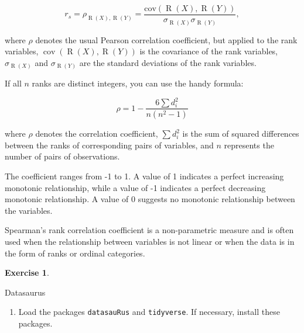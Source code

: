 \documentclass[
  12pt,
  oneside]{book}
\providecommand{\tightlist}{%
  \setlength{\itemsep}{0pt}\setlength{\parskip}{0pt}}
\theoremstyle{definition}
\theoremstyle{definition}
\theoremstyle{definition}
\newtheorem{exercise}{Exercise}[chapter]
\theoremstyle{definition}
\theoremstyle{remark}
\begin{document}
\[
r_s = \rho_{\operatorname{R}(X),\operatorname{R}(Y)} = \frac{\text{cov}(\operatorname{R}(X), \operatorname{R}(Y))}{\sigma_{\operatorname{R}(X)} \sigma_{\operatorname{R}(Y)}},
\]

where
\(\rho\) denotes the usual Pearson correlation coefficient, but applied to the rank variables,
\(\operatorname{cov}(\operatorname{R}(X), \operatorname{R}(Y))\) is the covariance of the rank variables,
\(\sigma_{\operatorname{R}(X)}\) and \(\sigma_{\operatorname{R}(Y)}\) are the standard deviations of the rank variables.

If all \(n\) ranks are distinct integers, you can use the handy formula:

\[
\rho = 1 - \frac{6\sum d_i^2}{n(n^2 - 1)}
\]

where \(\rho\) denotes the correlation coefficient, \(\sum d_i^2\) is the sum of squared differences between the ranks of corresponding pairs of variables, and \(n\) represents the number of pairs of observations.

The coefficient ranges from -1 to 1. A value of 1 indicates a perfect increasing monotonic relationship, while a value of -1 indicates a perfect decreasing monotonic relationship. A value of 0 suggests no monotonic relationship between the variables.

Spearman's rank correlation coefficient is a non-parametric measure and is often used when the relationship between variables is not linear or when the data is in the form of ranks or ordinal categories.

\begin{exercise}
\protect\hypertarget{exr:Datasaurus}{}\label{exr:Datasaurus}

Datasaurus

\begin{enumerate}
\def\labelenumi{\alph{enumi})}
\tightlist
\item
  Load the packages \texttt{datasauRus} and \texttt{tidyverse}. If necessary, install these packages.
\end{enumerate}

\end{exercise}
\end{document}

